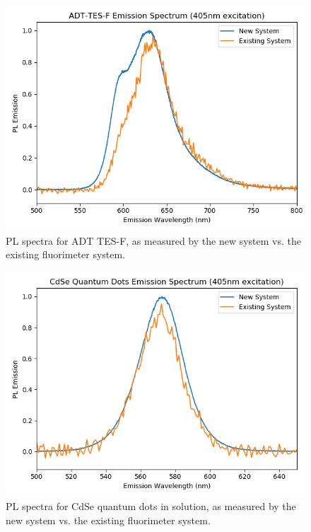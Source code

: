 \begin{figure}[h]
    \centering
    \includegraphics[width=\textwidth]{./img/tesf-2.png}
    \caption{PL spectra for ADT TES-F, as measured by the new system vs. the existing fluorimeter system.}
    \label{fig:pl-adt-tesf}
\end{figure}

\begin{figure}[h]
    \centering
    \includegraphics[width=\textwidth]{./img/qd-2.png}
    \caption{PL spectra for CdSe quantum dots in solution, as measured by the new system vs. the existing fluorimeter system.}
    \label{fig:pl-adt-qd}
\end{figure}